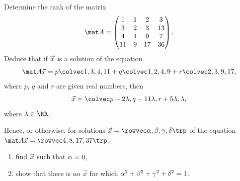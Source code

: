\begin{problem}
    Determine the rank of the matrix \[\mat A = \begin{pmatrix}1 & 1 & 2 & 3 \\ 3 & 2 & 3 & 13 \\ 4 & 4 & 9 & 7 \\ 11 & 9 & 17 & 36\end{pmatrix}.\] Deduce that if $\vec x$ is a solution of the equation \[\mat A \vec x = p \cveciv134{11} + q \cveciv1249 + r \cveciv239{17},\] where $p$, $q$ and $r$ are given real numbers, then \[\vec x = \cveciv{p - 2\l}{q-11\l}{r+5\l}{\l},\] where $\l \in \RR$.

    Hence, or otherwise, for solutions $\vec x = \cvecivx\a\b\g\de$ of the equation $\mat A \vec x = \cvecivx48{17}{37}$,
    \begin{enumerate}
        \item find $\vec x$ such that $\alpha = 0$,
        \item show that there is no $\vec x$ for which $\alpha^2 + \beta^2 + \gamma^2 + \delta^2 = 1$.
    \end{enumerate}
\end{problem}
